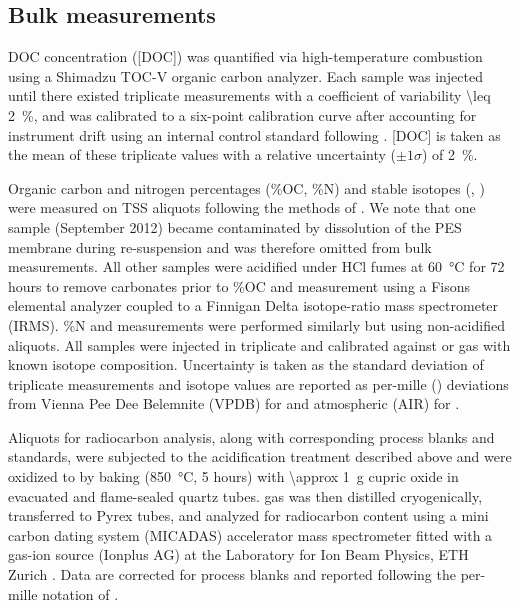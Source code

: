 \subsection{Bulk measurements}

DOC concentration ([DOC]) was quantified via high-temperature combustion using a Shimadzu TOC-V organic carbon analyzer. Each sample was injected until there existed triplicate measurements with a coefficient of variability \SI{\leq 2}{\%}, and was calibrated to a six-point calibration curve after accounting for instrument drift using an internal control standard following \citet{Mann:2012kp}. [DOC] is taken as the mean of these triplicate values with a relative uncertainty ($\pm 1 \sigma$) of \SI{2}{\%}.

Organic carbon and nitrogen percentages (\%OC, \%N) and stable isotopes (, ) were measured on TSS aliquots following the methods of \citet{Whiteside:2011jea}. We note that one sample (September 2012) became contaminated by dissolution of the PES membrane during re-suspension and was therefore omitted from bulk measurements. All other samples were acidified under HCl fumes at \SI{60}{\celsius} for 72 hours to remove carbonates prior to \%OC and  measurement using a Fisons elemental analyzer coupled to a Finnigan Delta isotope-ratio mass spectrometer (IRMS). \%N and  measurements were performed similarly but using non-acidified aliquots. All samples were injected in triplicate and calibrated against  or  gas with known isotope composition. Uncertainty is taken as the standard deviation of triplicate measurements and isotope values are reported as per-mille (\si{\permil}) deviations from Vienna Pee Dee Belemnite (VPDB) for  and atmospheric  (AIR) for .

Aliquots for radiocarbon analysis, along with corresponding process blanks and standards, were subjected to the acidification treatment described above and were oxidized to  by baking (\SI{850}{\celsius}, 5 hours) with \SI{\approx 1}{g} cupric oxide in evacuated and flame-sealed quartz tubes.  gas was then distilled cryogenically, transferred to Pyrex tubes, and analyzed for radiocarbon content using a mini carbon dating system (MICADAS) accelerator mass spectrometer fitted with a gas-ion source (Ionplus AG) at the Laboratory for Ion Beam Physics, ETH Zurich \citep{Christl:2013ks}. Data are corrected for process blanks and reported following the  per-mille notation of \citet{Stuiver:1977uh}.

